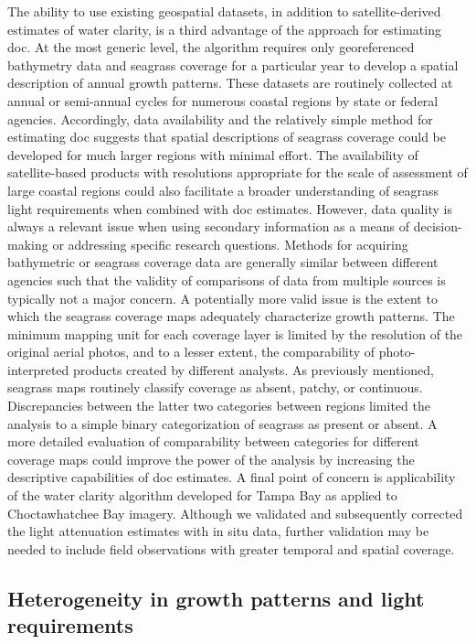 \documentclass[letterpaper,12pt,oneside]{article}\usepackage[]{graphicx}\usepackage[]{color}
\begin{document}
The ability to use existing geospatial datasets, in addition to satellite-derived estimates of water clarity, is a third advantage of the approach for estimating \ac{doc}.  At the most generic level, the algorithm requires only georeferenced bathymetry data and seagrass coverage for a particular year to develop a spatial description of annual growth patterns.  These datasets are routinely collected at annual or semi-annual cycles for numerous coastal regions by state or federal agencies.  Accordingly, data availability and the relatively simple method for estimating \ac{doc} suggests that spatial descriptions of seagrass coverage could be developed for much larger regions with minimal effort.  The availability of satellite-based products with resolutions appropriate for the scale of assessment of large coastal regions could also facilitate a broader understanding of seagrass light requirements when combined with \ac{doc} estimates.  However, data quality is always a relevant issue when using secondary information as a means of decision-making or addressing specific research questions.  Methods for acquiring bathymetric or seagrass coverage data are generally similar between different agencies such that the validity of comparisons of data from multiple sources is typically not a major concern.  A potentially more valid issue is the extent to which the seagrass coverage maps adequately characterize growth patterns.  The minimum mapping unit for each coverage layer is limited by the resolution of the original aerial photos, and to a lesser extent, the comparability of photo-interpreted products created by different analysts.  As previously mentioned, seagrass maps routinely classify coverage as absent, patchy, or continuous.  Discrepancies between the latter two categories between regions limited the analysis to a simple binary categorization of seagrass as present or absent. A more detailed evaluation of comparability between categories for different coverage maps could improve the power of the analysis by increasing the descriptive capabilities of \ac{doc} estimates.  A final point of concern is applicability of the water clarity algorithm developed for Tampa Bay as applied to Choctawhatchee Bay imagery.  Although we validated and subsequently corrected the light attenuation estimates with in situ data, further validation may be needed to include field observations with greater temporal and spatial coverage. 

\subsection{Heterogeneity in growth patterns and light requirements}
\end{document}
